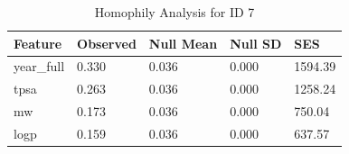 \begin{table}
\caption{Homophily Analysis for ID 7}
\label{tab:homophily_id7}
\begin{tabular}{lllll}
\toprule
Feature & Observed & Null Mean & Null SD & SES \\
\midrule
year_full & 0.330 & 0.036 & 0.000 & 1594.39 \\
tpsa & 0.263 & 0.036 & 0.000 & 1258.24 \\
mw & 0.173 & 0.036 & 0.000 & 750.04 \\
logp & 0.159 & 0.036 & 0.000 & 637.57 \\
\bottomrule
\end{tabular}
\end{table}
